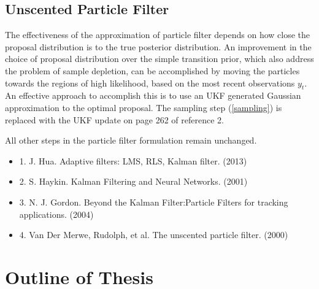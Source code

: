 \subsection*{Unscented Particle Filter}

The effectiveness of the approximation of particle filter depends on how close the proposal distribution is to the true posterior distribution. An improvement in the choice of proposal distribution over the simple transition prior, which also address the problem of sample depletion, can be accomplished by moving the particles towards the regions of high likelihood, based on the most recent observations $y_t$. An effective approach to accomplish this is to use an UKF generated Gaussian approximation to the optimal proposal. The sampling step (\ref{sampling}) is replaced with the UKF update on page 262 of reference 2.

All other steps in the particle filter formulation remain unchanged.



\begin{itemize}
\item 1. J. Hua. Adaptive filters: LMS, RLS, Kalman filter. (2013)
\item 2. S. Haykin. Kalman Filtering and Neural Networks. (2001)
\item 3. N. J. Gordon. Beyond the Kalman Filter:Particle Filters for tracking applications. (2004)
\item 4. Van Der Merwe, Rudolph, et al. The unscented particle filter. (2000)
\end{itemize}


\section{Outline of Thesis}

